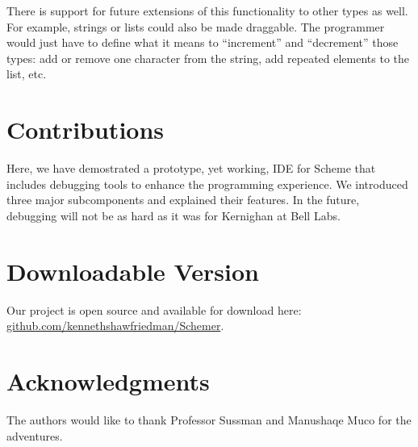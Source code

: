 \documentclass[10pt,journal,compsoc]{IEEEtran}
\begin{document}
There is support for future extensions of this functionality to other types as well. For example, strings or lists could also be made draggable. The programmer would just have to define what it means to “increment” and “decrement” those types: add or remove one character from the string, add repeated elements to the list, etc. 
		
		\section{Contributions}
		Here, we have demostrated a prototype, yet working, IDE for Scheme that includes debugging tools to enhance the programming experience. We introduced three major subcomponents and explained their features. In the future, debugging will not be as hard as it was for Kernighan at Bell Labs.
		\section{Downloadable Version}
		Our project is open source and available for download here: \href{https://github.com/kennethshawfriedman/Schemer}{github.com/kennethshawfriedman/Schemer}.
		\section{Acknowledgments}
		The authors would like to thank Professor Sussman and Manushaqe Muco for the adventures.
		
\end{document}

